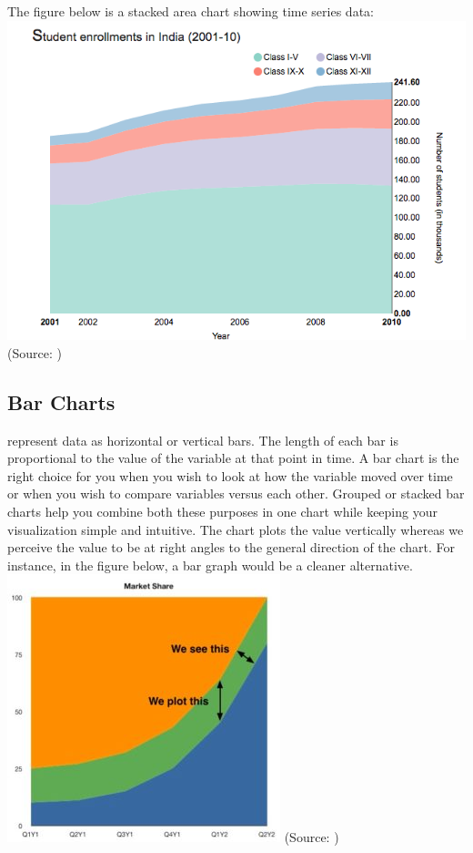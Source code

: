 \documentclass[]{book}
\theoremstyle{definition}
\theoremstyle{definition}
\theoremstyle{definition}
\theoremstyle{remark}
\begin{document}
The figure below is a stacked area chart showing time series data:
\includegraphics{images/aya-stacked.png} (Source:
\citep{aya-time-series})

\subsection{Bar Charts}\label{bar-charts}

represent data as horizontal or vertical bars. The length of each bar is
proportional to the value of the variable at that point in time. A bar
chart is the right choice for you when you wish to look at how the
variable moved over time or when you wish to compare variables versus
each other. Grouped or stacked bar charts help you combine both these
purposes in one chart while keeping your visualization simple and
intuitive. The chart plots the value vertically whereas we perceive the
value to be at right angles to the general direction of the chart. For
instance, in the figure below, a bar graph would be a cleaner
alternative. \includegraphics{images/aya-stacked-perception.jpg}
(Source: \citep{aya-time-series})
\end{document}
